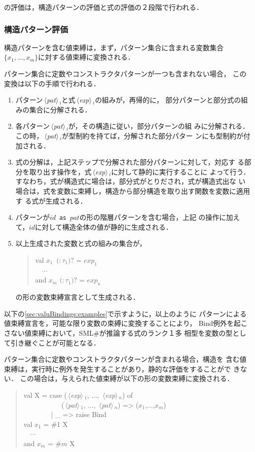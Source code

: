\documentclass{jbook}
\newcommand{\smlsharp}{SML\#}
\newcommand{\nonterm}[1]{\mbox{$\,\langle$}{\it #1}\mbox{$\rangle\,$}}
\newcommand{\optional}[1]{\mbox{$($}{\protect #1}\mbox{$)?$}}
\newcommand{\myem}{\mbox{\ \ }}
\newenvironment{program}{\begin{quote}\begin{tt}}%
                        {\end{tt}\end{quote}}
\begin{document}
の評価は，構造パターンの評価と式の評価の２段階で行われる．

\subsubsection{構造パターン評価}

	構造パターンを含む値束縛は，まず，パターン集合に含まれる変数集合
$\{x_1,\ldots,x_m\}$に対する値束縛に変換される．
	
	パターン集合に定数やコンストラクタパターンが一つも含まれない場合，
この変換は以下の手順で行われる．
\begin{enumerate}
\item 
	パターン\nonterm{pat}$_i$と式\nonterm{exp}$_i$の組みが，再帰的に，
部分パターンと部分式の組みの集合に分解される．

\item 
	各パターン\nonterm{pat}$_i$が，その構造に従い，部分パターンの組
みに分解される．
	この時，\nonterm{pat}$_i$が型制約を持てば，分解された部分パター
ンにも型制約が付加される．

\item 
	式の分解は，上記ステップで分解された部分パターンに対して，対応す
る部分を取り出す操作を，式\nonterm{exp}$_i$に対して静的に実行することに
よって行う．
	すなわち，式が構造式に場合は，部分式がとりだされ，式が構造式出な
い場合は，式を変数に束縛し，構造から部分構造を取り出す関数を変数に適用す
る式が生成される．

\item 
	パターンが{\tt $id$ as $pat$}の形の階層パターンを含む場合，上記
の操作に加えて，$id$に対して構造全体の値が静的に生成される．

\item 以上生成された変数と式の組みの集合が，
\begin{program}
  val $x_1$\ \optional{$:\tau_1$} = $exp_1$\\
  \myem $\cdots$\\
  and $x_m$ \optional{$:\tau_1$} = $exp_n$
\end{program}
の形の変数束縛宣言として生成される．
\end{enumerate}
	以下の\ref{sec:valuBindings:examples}で示すように，以上のように
パターンによる値束縛宣言を，可能な限り変数の束縛に変換することにより，
Bind例外を起こさない値束縛において，\smlsharp{}が推論する式のランク１多
相型を変数の型として引き継ぐことが可能となる．

	パターン集合に定数やコンストラクタパターンが含まれる場合，構造を
含む値束縛は，実行時に例外を発生することがあり，静的な評価をすることがで
きない．
	この場合は，与えられた値束縛が以下の形の変数束縛に変換される．
\begin{program}
  val X = case (\nonterm{exp}$_1$, $\ldots$, \nonterm{exp}$_n$) of\\
  \myem\myem\myem\myem\ \ \ (\nonterm{pat}$_1$, $\ldots$, \nonterm{pat}$_n$) => ($x_1$,$\ldots$,$x_m$)\\
  \myem\myem\myem\myem | \_ => raise Bind\\
  val $x_1$ = \#1 X\\
  \myem $\cdots$\\
  and $x_m$ = \#$m$ X
\end{program}
\end{document}

